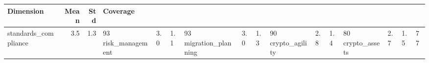 \begin{tabular}{lrrl}
\toprule
Dimension & Mean & Std & Coverage \\
\midrule
standards_compliance & 3.5 & 1.3 & 93%
risk_management & 3.0 & 1.1 & 93%
migration_planning & 3.0 & 1.3 & 90%
crypto_agility & 2.8 & 1.4 & 80%
crypto_assets & 2.7 & 1.5 & 77%
\bottomrule
\end{tabular}
